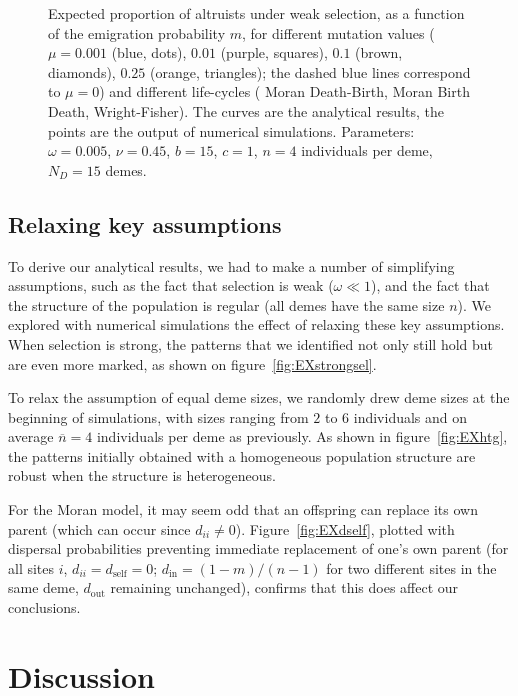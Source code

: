 \documentclass[11pt, letterpaper]{article}
\newcommand{\mutbias}{\nu}
\newcommand{\self}{\textrm{self}}
\newcommand{\inn}{\textrm{in}}
\newcommand{\out}{\textrm{out}}
\newcommand{\din}{d_{\inn}}
\newcommand{\dself}{d_{\self}}
\newcommand{\dout}{d_{\out}}
\newcommand{\ndemes}{N_D}
\begin{document}
\begin{figure}
\begin{tabular}{ccc}
\end{tabular}
\caption{Expected proportion of altruists under weak selection, as a function of the emigration probability $m$, for different mutation values ($\mu = 0.001$ (blue, dots), $0.01$ (purple, squares), $0.1$ (brown, diamonds), $0.25$ (orange, triangles); the dashed blue lines correspond to $\mu=0$) and different life-cycles ( Moran Death-Birth,  Moran Birth Death,  Wright-Fisher). The curves are the analytical results, the points are the output of numerical simulations. 
Parameters: $\omega = 0.005$, $\mutbias=0.45$, $b = 15$, $c = 1$, $n=4$ individuals per deme, $\ndemes=15$ demes.}
\label{fig:EX}
\end{figure}

\subsection{Relaxing key assumptions}

To derive our analytical results, we had to make a number of simplifying assumptions, such as the fact that selection is weak ($\omega \ll 1$), and the fact that the structure of the population is regular (all demes have the same size $n$). We explored with numerical simulations the effect of relaxing these key assumptions. When selection is strong, the patterns that we identified not only still hold but are even more marked, as shown on  figure~\ref{fig:EXstrongsel}. 

To relax the assumption of equal deme sizes, we randomly drew deme sizes at the beginning of simulations, with sizes ranging from $2$ to $6$ individuals and on average $\overline{n} = 4$ individuals per deme as previously. As shown in figure~\ref{fig:EXhtg}, the patterns initially obtained with a homogeneous population structure are robust when the structure is heterogeneous. 
 
For the Moran model, it may seem odd that an offspring can replace its own parent (which can occur since $d_{ii} \neq 0$). Figure~\ref{fig:EXdself}, plotted with dispersal probabilities preventing immediate replacement of one's own parent (for all sites $i$, $d_{ii}=\dself=0$; $\din = (1-m)/(n-1)$ for two different sites in the same deme, $\dout$ remaining unchanged), confirms that this does affect our conclusions. 

\section{Discussion}
\end{document}
